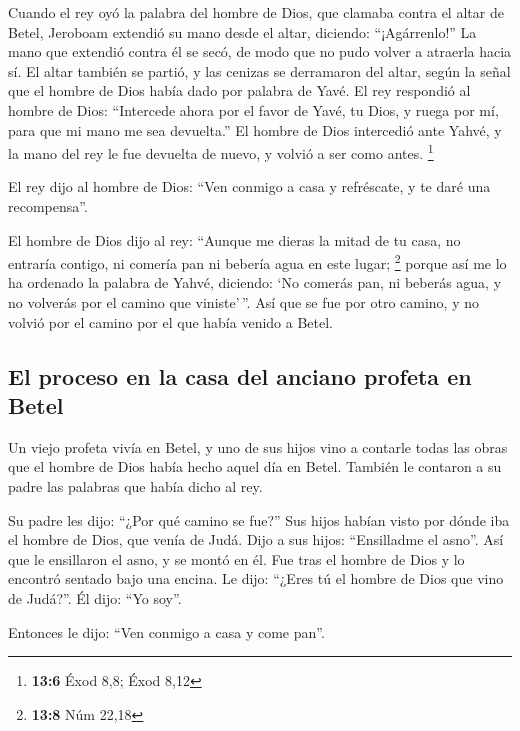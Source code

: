  Cuando el rey oyó la palabra del hombre de Dios, que
clamaba contra el altar de Betel, Jeroboam extendió su mano desde el
altar, diciendo: ``¡Agárrenlo!'' La mano que extendió contra él se secó,
de modo que no pudo volver a atraerla hacia sí.  El altar
también se partió, y las cenizas se derramaron del altar, según la señal
que el hombre de Dios había dado por palabra de Yavé.  El
rey respondió al hombre de Dios: ``Intercede ahora por el favor de Yavé,
tu Dios, y ruega por mí, para que mi mano me sea devuelta.'' El hombre
de Dios intercedió ante Yahvé, y la mano del rey le fue devuelta de
nuevo, y volvió a ser como antes. \footnote{\textbf{13:6} Éxod 8,8; Éxod
  8,12}

 El rey dijo al hombre de Dios: ``Ven conmigo a casa y
refréscate, y te daré una recompensa''.

 El hombre de Dios dijo al rey: ``Aunque me dieras la
mitad de tu casa, no entraría contigo, ni comería pan ni bebería agua en
este lugar; \footnote{\textbf{13:8} Núm 22,18}  porque así
me lo ha ordenado la palabra de Yahvé, diciendo: `No comerás pan, ni
beberás agua, y no volverás por el camino que viniste'\,''.
 Así que se fue por otro camino, y no volvió por el
camino por el que había venido a Betel.

\hypertarget{el-proceso-en-la-casa-del-anciano-profeta-en-betel}{%
\subsection{El proceso en la casa del anciano profeta en
Betel}\label{el-proceso-en-la-casa-del-anciano-profeta-en-betel}}

 Un viejo profeta vivía en Betel, y uno de sus hijos vino
a contarle todas las obras que el hombre de Dios había hecho aquel día
en Betel. También le contaron a su padre las palabras que había dicho al
rey.

 Su padre les dijo: ``¿Por qué camino se fue?'' Sus hijos
habían visto por dónde iba el hombre de Dios, que venía de Judá.
 Dijo a sus hijos: ``Ensilladme el asno''. Así que le
ensillaron el asno, y se montó en él.  Fue tras el hombre
de Dios y lo encontró sentado bajo una encina. Le dijo: ``¿Eres tú el
hombre de Dios que vino de Judá?''. Él dijo: ``Yo soy''.

 Entonces le dijo: ``Ven conmigo a casa y come pan''.

